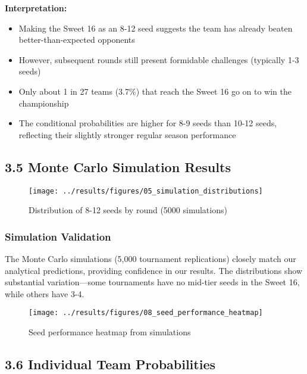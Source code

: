 \documentclass[
]{article}
\providecommand{\tightlist}{%
  \setlength{\itemsep}{0pt}\setlength{\parskip}{0pt}}
\begin{document}
\textbf{Interpretation:}

\begin{itemize}
\tightlist
\item
  Making the Sweet 16 as an 8-12 seed suggests the team has already
  beaten better-than-expected opponents
\item
  However, subsequent rounds still present formidable challenges
  (typically 1-3 seeds)
\item
  Only about 1 in 27 teams (3.7\%) that reach the Sweet 16 go on to win
  the championship
\item
  The conditional probabilities are higher for 8-9 seeds than 10-12
  seeds, reflecting their slightly stronger regular season performance
\end{itemize}

\subsection{3.5 Monte Carlo Simulation
Results}\label{monte-carlo-simulation-results}

\begin{figure}

{\centering \texttt{[image: ../results/figures/05\_simulation\_distributions]} 

}

\caption{Distribution of 8-12 seeds by round (5000 simulations)}\label{fig:simulation-plot}
\end{figure}

\subsubsection{Simulation Validation}\label{simulation-validation}

The Monte Carlo simulations (5,000 tournament replications) closely
match our analytical predictions, providing confidence in our results.
The distributions show substantial variation---some tournaments have no
mid-tier seeds in the Sweet 16, while others have 3-4.

\begin{figure}

{\centering \texttt{[image: ../results/figures/08\_seed\_performance\_heatmap]} 

}

\caption{Seed performance heatmap from simulations}\label{fig:heatmap}
\end{figure}

\subsection{3.6 Individual Team
Probabilities}\label{individual-team-probabilities}
\end{document}
